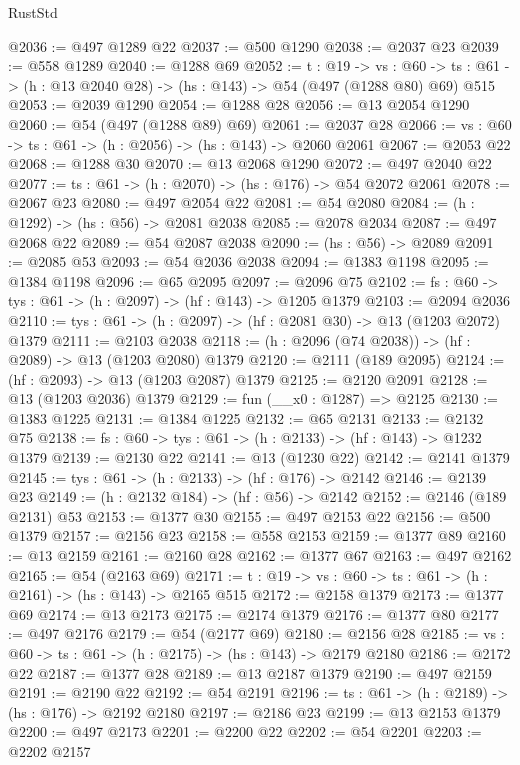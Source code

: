 \begin{lexlean}{RustStd}
\begin{coremodule}
@2036 := @497 @1289 @22
@2037 := @500 @1290
@2038 := @2037 @23
@2039 := @558 @1289
@2040 := @1288 @69
@2052 := {t : @19} ->
  {vs : @60} -> {ts : @61} -> (h : @13 @2040 @28) -> (hs : @143) -> @54 (@497 (@1288 @80) @69) @515
@2053 := @2039 @1290
@2054 := @1288 @28
@2056 := @13 @2054 @1290
@2060 := @54 (@497 (@1288 @89) @69)
@2061 := @2037 @28
@2066 := {vs : @60} -> {ts : @61} -> (h : @2056) -> (hs : @143) -> @2060 @2061
@2067 := @2053 @22
@2068 := @1288 @30
@2070 := @13 @2068 @1290
@2072 := @497 @2040 @22
@2077 := {ts : @61} -> (h : @2070) -> (hs : @176) -> @54 @2072 @2061
@2078 := @2067 @23
@2080 := @497 @2054 @22
@2081 := @54 @2080
@2084 := (h : @1292) -> (hs : @56) -> @2081 @2038
@2085 := @2078 @2034
@2087 := @497 @2068 @22
@2089 := @54 @2087 @2038
@2090 := (hs : @56) -> @2089
@2091 := @2085 @53
@2093 := @54 @2036 @2038
@2094 := @1383 @1198
@2095 := @1384 @1198
@2096 := @65 @2095
@2097 := @2096 @75
@2102 := {fs : @60} -> {tys : @61} -> (h : @2097) -> (hf : @143) -> @1205 @1379
@2103 := @2094 @2036
@2110 := {tys : @61} -> (h : @2097) -> (hf : @2081 @30) -> @13 (@1203 @2072) @1379
@2111 := @2103 @2038
@2118 := (h : @2096 (@74 @2038)) -> (hf : @2089) -> @13 (@1203 @2080) @1379
@2120 := @2111 (@189 @2095)
@2124 := (hf : @2093) -> @13 (@1203 @2087) @1379
@2125 := @2120 @2091
@2128 := @13 (@1203 @2036) @1379
@2129 := fun (__x0 : @1287) => @2125
@2130 := @1383 @1225
@2131 := @1384 @1225
@2132 := @65 @2131
@2133 := @2132 @75
@2138 := {fs : @60} -> {tys : @61} -> (h : @2133) -> (hf : @143) -> @1232 @1379
@2139 := @2130 @22
@2141 := @13 (@1230 @22)
@2142 := @2141 @1379
@2145 := {tys : @61} -> (h : @2133) -> (hf : @176) -> @2142
@2146 := @2139 @23
@2149 := (h : @2132 @184) -> (hf : @56) -> @2142
@2152 := @2146 (@189 @2131) @53
@2153 := @1377 @30
@2155 := @497 @2153 @22
@2156 := @500 @1379
@2157 := @2156 @23
@2158 := @558 @2153
@2159 := @1377 @89
@2160 := @13 @2159
@2161 := @2160 @28
@2162 := @1377 @67
@2163 := @497 @2162
@2165 := @54 (@2163 @69)
@2171 := {t : @19} -> {vs : @60} -> {ts : @61} -> (h : @2161) -> (hs : @143) -> @2165 @515
@2172 := @2158 @1379
@2173 := @1377 @69
@2174 := @13 @2173
@2175 := @2174 @1379
@2176 := @1377 @80
@2177 := @497 @2176
@2179 := @54 (@2177 @69)
@2180 := @2156 @28
@2185 := {vs : @60} -> {ts : @61} -> (h : @2175) -> (hs : @143) -> @2179 @2180
@2186 := @2172 @22
@2187 := @1377 @28
@2189 := @13 @2187 @1379
@2190 := @497 @2159
@2191 := @2190 @22
@2192 := @54 @2191
@2196 := {ts : @61} -> (h : @2189) -> (hs : @176) -> @2192 @2180
@2197 := @2186 @23
@2199 := @13 @2153 @1379
@2200 := @497 @2173
@2201 := @2200 @22
@2202 := @54 @2201
@2203 := @2202 @2157

\end{coremodule}
\end{lexlean}
